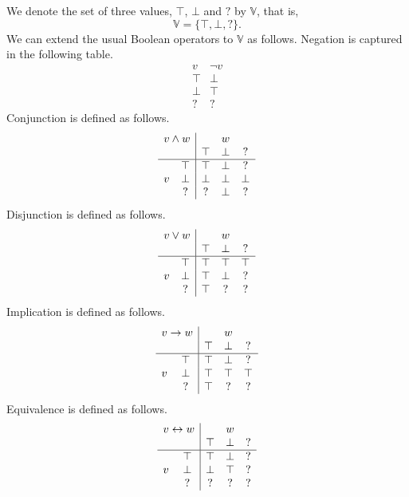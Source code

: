 \documentclass[12pt]{article}
\theoremstyle{definition}
\newcommand{\bottom}{\mathord{\perp}}
\begin{document}
We denote the set of three values, $\top$, $\bottom$ and $?$ by $\mathbb{V}$, that is,
\[
\mathbb{V} = \{ \top, \bottom, \mathord{?} \}.
\]
We can extend the usual Boolean operators to $\mathbb{V}$ as follows.  Negation is captured in the following table.
\[
\begin{array}{c|c}
v & \neg v\\\hline
\top & \bottom\\
\bottom & \top\\
\mathord{?} & \mathord{?}
\end{array}
\]
Conjunction is defined as follows.
\[
\begin{array}{cc|ccc}
\multicolumn{2}{c|}{v \wedge w} & & w &\\
&& \top & \bottom & \mathord{?}\\\hline
& \top & \top & \bottom & \mathord{?}\\
v & \bottom & \bottom & \bottom & \bottom\\
& \mathord{?} & \mathord{?} & \bottom & \mathord{?}
\end{array}
\]
Disjunction is defined as follows.
\[
\begin{array}{cc|ccc}
\multicolumn{2}{c|}{v \vee w} & & w &\\
&& \top & \bottom & \mathord{?}\\\hline
& \top & \top & \top & \top\\
v & \bottom & \top & \bottom & \mathord{?}\\
& \mathord{?} & \top & \mathord{?} & \mathord{?}
\end{array}
\]
Implication is defined as follows.
\[
\begin{array}{cc|ccc}
\multicolumn{2}{c|}{v \rightarrow w} & & w &\\
&& \top & \bottom & \mathord{?}\\\hline
& \top & \top & \bottom & ?\\
v & \bottom & \top & \top & \top\\
& \mathord{?} & \top & ? & ?
\end{array}
\]
Equivalence is defined as follows.
\[
\begin{array}{cc|ccc}
\multicolumn{2}{c|}{v \leftrightarrow w} & & w &\\
&& \top & \bottom & \mathord{?}\\\hline
& \top & \top & \bottom & ?\\
v & \bottom & \bottom & \top & ?\\
& \mathord{?} & ? & ? & ?
\end{array}
\]
\end{document}
